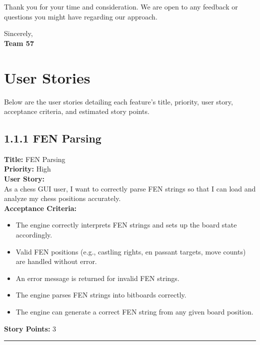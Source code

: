 \documentclass[12pt]{article}
\begin{document}
Thank you for your time and consideration. We are open to any feedback or questions you might have regarding our approach.

Sincerely,\\[1ex]
\textbf{Team 57}
\newpage

\section{User Stories}
Below are the user stories detailing each feature’s title, priority, user story, acceptance criteria, and estimated story points.

\subsection{1.1.1 FEN Parsing}
\textbf{Title:} FEN Parsing\\
\textbf{Priority:} High\\
\textbf{User Story:}\\
As a chess GUI user, I want to correctly parse FEN strings so that I can load and analyze my chess positions accurately.\\
\textbf{Acceptance Criteria:}
\begin{itemize}
    \item The engine correctly interprets FEN strings and sets up the board state accordingly.
    \item Valid FEN positions (e.g., castling rights, en passant targets, move counts) are handled without error.
    \item An error message is returned for invalid FEN strings.
    \item The engine parses FEN strings into bitboards correctly.
    \item The engine can generate a correct FEN string from any given board position.
\end{itemize}
\textbf{Story Points:} 3

\bigskip
\hrule
\bigskip
\end{document}

